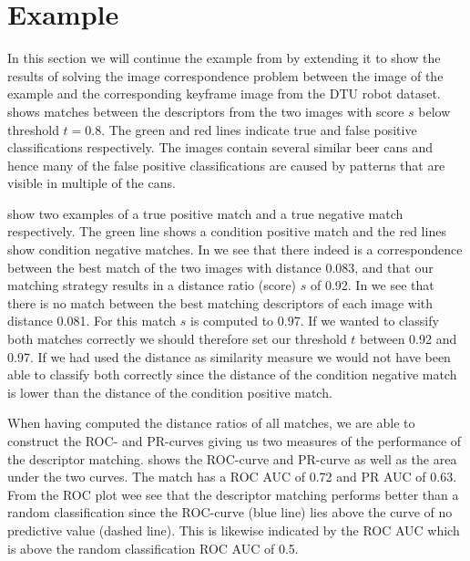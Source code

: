 \documentclass[thesis.tex]{subfiles}
\begin{document}
\section{Example}
%
In this section we will continue the example from  by extending it to show the results of solving the image correspondence problem between the image of the example and the corresponding keyframe image from the DTU robot dataset.
 shows matches between the descriptors from the two images with score $s$ below threshold $t = 0.8$. The green and red lines indicate true and false positive classifications respectively. The images contain several similar beer cans and hence many of the false positive classifications are caused by patterns that are visible in multiple of the cans.

 show two examples of a true positive match and a true negative match respectively. The green line shows a condition positive match and the red lines show condition negative matches. In  we see that there indeed is a correspondence between the best match of the two images with distance 0.083, and that our matching strategy results in a distance ratio (score) $s$ of 0.92. In  we see that there is no match between the best matching descriptors of each image with distance 0.081. For this match $s$ is computed to 0.97. If we wanted to classify both matches correctly we should therefore set our threshold $t$ between 0.92 and 0.97. If we had used the distance as similarity measure we would not have been able to classify both correctly since the distance of the condition negative match is lower than the distance of the condition positive match.

When having computed the distance ratios of all matches, we are able to construct the ROC- and PR-curves giving us two measures of the performance of the descriptor matching.  shows the ROC-curve  and PR-curve  as well as the area under the two curves. The match has a ROC AUC of 0.72 and PR AUC of 0.63. From the ROC plot wee see that the descriptor matching performs better than a random classification since the ROC-curve (blue line) lies above the curve of no predictive value (dashed line). This is likewise indicated by the ROC AUC which is above the random classification ROC AUC of 0.5.
\end{document}
